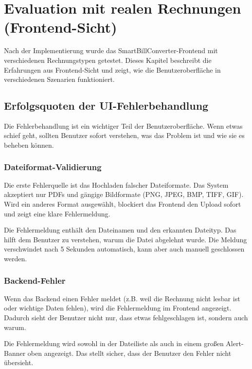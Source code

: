 ﻿
\chapter{Evaluation mit realen Rechnungen (Frontend-Sicht)}
\label{chap:frontend_evaluation}

Nach der Implementierung wurde das SmartBillConverter-Frontend mit verschiedenen Rechnungstypen getestet. Dieses Kapitel beschreibt die Erfahrungen aus Frontend-Sicht und zeigt, wie die Benutzeroberfläche in verschiedenen Szenarien funktioniert.

\section{Erfolgsquoten der UI-Fehlerbehandlung}

Die Fehlerbehandlung ist ein wichtiger Teil der Benutzeroberfläche. Wenn etwas schief geht, sollten Benutzer sofort verstehen, was das Problem ist und wie sie es beheben können.

\subsection{Dateiformat-Validierung}

Die erste Fehlerquelle ist das Hochladen falscher Dateiformate. Das System akzeptiert nur PDFs und gängige Bildformate (PNG, JPEG, BMP, TIFF, GIF). Wird ein anderes Format ausgewählt, blockiert das Frontend den Upload sofort und zeigt eine klare Fehlermeldung.

Die Fehlermeldung enthält den Dateinamen und den erkannten Dateityp. Das hilft dem Benutzer zu verstehen, warum die Datei abgelehnt wurde. Die Meldung verschwindet nach 5 Sekunden automatisch, kann aber auch manuell geschlossen werden.

\subsection{Backend-Fehler}

Wenn das Backend einen Fehler meldet (z.B. weil die Rechnung nicht lesbar ist oder wichtige Daten fehlen), wird die Fehlermeldung im Frontend angezeigt. Dadurch sieht der Benutzer nicht nur, dass etwas fehlgeschlagen ist, sondern auch warum.

Die Fehlermeldung wird sowohl in der Dateiliste als auch in einem großen Alert-Banner oben angezeigt. Das stellt sicher, dass der Benutzer den Fehler nicht übersieht.

